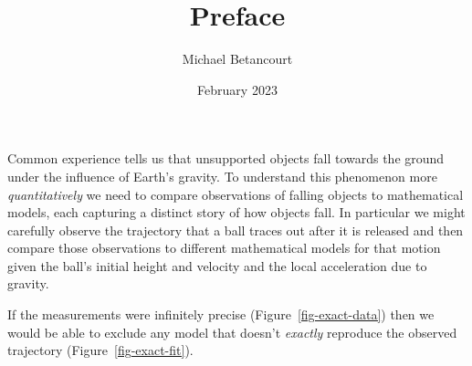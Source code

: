 \documentclass[
  letterpaper,
  DIV=11,
  numbers=noendperiod]{scrartcl}
\title{Preface}
\author{Michael Betancourt}
\date{February 2023}
\renewcommand*\contentsname{Table of contents}
\newcommand\contentsname{Table of contents}
\begin{document}
\maketitle
\ifdefined\Shaded\renewenvironment{Shaded}{\begin{tcolorbox}[breakable, interior hidden, sharp corners, enhanced, borderline west={3pt}{0pt}{shadecolor}, frame hidden, boxrule=0pt]}{\end{tcolorbox}}\fi

\renewcommand*\contentsname{Table of contents}
{
\hypersetup{linkcolor=}
\setcounter{tocdepth}{3}
\tableofcontents
}
Common experience tells us that unsupported objects fall towards the
ground under the influence of Earth's gravity. To understand this
phenomenon more \emph{quantitatively} we need to compare observations of
falling objects to mathematical models, each capturing a distinct story
of how objects fall. In particular we might carefully observe the
trajectory that a ball traces out after it is released and then compare
those observations to different mathematical models for that motion
given the ball's initial height and velocity and the local acceleration
due to gravity.

If the measurements were infinitely precise
(Figure~\ref{fig-exact-data}) then we would be able to exclude any model
that doesn't \emph{exactly} reproduce the observed trajectory
(Figure~\ref{fig-exact-fit}).
\end{document}
